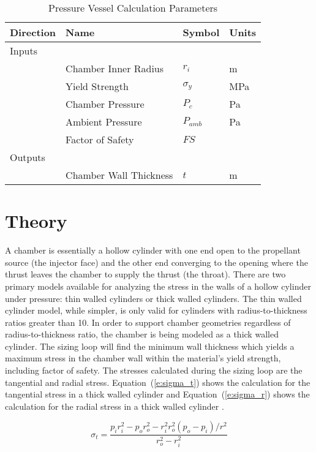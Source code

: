 \documentclass{article}
\begin{document}
\begin{table}[ht!]%
  \caption{Pressure Vessel Calculation Parameters}
  \centering
  \begin{tabular}{llll}
   Direction & Name & Symbol & Units \\
	\hline\hline
     Inputs & & &\\
     	        & Chamber Inner Radius & $r_i$ & m \\
                & Yield Strength & $\sigma_y$ & MPa \\
                & Chamber Pressure & $P_c$ & Pa \\
                & Ambient Pressure & $P_{amb}$ & Pa \\
                & Factor of Safety & $FS$ & \\
      Outputs & & & \\
                & Chamber Wall Thickness & $t$ & m \\
	\hline
  \end{tabular}
 \label{t:parameters}
\end{table}


\section{Theory}
A chamber is essentially a hollow cylinder with one end open to the propellant source (the injector face) and the other end converging to the opening where the thrust leaves the chamber to supply the thrust (the throat).  There are two primary models available for analyzing the stress in the walls of a hollow cylinder under pressure:  thin walled cylinders or thick walled cylinders.  The thin walled cylinder model, while simpler, is only valid for cylinders with radius-to-thickness ratios greater than 10.  In order to support chamber geometries regardless of radius-to-thickness ratio, the chamber is being modeled as a thick walled cylinder.  The sizing loop will find the minimum wall thickness which yields a maximum stress in the chamber wall within the material's yield strength, including factor of safety.  The stresses calculated during the sizing loop are the tangential and radial stress.  Equation~(\ref{e:sigma_t}) shows the calculation for the tangential stress in a thick walled cylinder and Equation~(\ref{e:sigma_r}) shows the calculation for the radial stress in a thick walled cylinder \cite{Shigley1989}. 

\begin{equation}
 \label{e:sigma_t}
  \sigma_t = \frac{p_i r_i^2 - p_o r_o^2 - r_i^2 r_o^2 (p_o - p_i)/r^2}{r_o^2 - r_i^2}
\end{equation}
\end{document}
